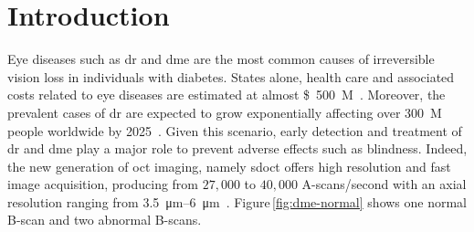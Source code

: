 
\graphicspath{ {./content/intro/figures/} }

\section{Introduction}

Eye diseases such as \ac{dr} and \ac{dme} are the most common causes of irreversible vision loss in individuals with diabetes.
States alone, health care and associated costs related to eye diseases are estimated at almost \SI{500}[\$]{M}~\cite{Sharma2005}.
Moreover, the prevalent cases of \ac{dr} are expected to grow exponentially affecting over \SI{300}{M} people worldwide by 2025~\cite{Wild2004}.
Given this scenario, early detection and treatment of \ac{dr} and \ac{dme} play a major role to prevent adverse effects such as blindness.
Indeed, the new generation of \ac{oct} imaging, namely \ac{sdoct} offers high resolution and fast image acquisition, producing from $27,000$ to $40,000$ A-scans/second with an axial resolution ranging from \SIrange{3.5}{6}{\micro \metre}~\cite{Chen2005}. 
Figure\,\ref{fig:dme-normal} shows one normal B-scan and two abnormal B-scans.
